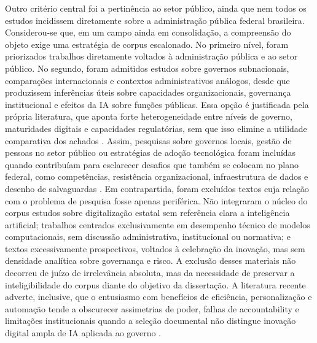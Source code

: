 \documentclass[12pt,a4paper]{article}
\begin{document}
Outro critério central foi a pertinência ao setor público, ainda que nem todos os estudos incidissem diretamente sobre a administração pública federal brasileira. Considerou-se que, em um campo ainda em consolidação, a compreensão do objeto exige uma estratégia de corpus escalonado. No primeiro nível, foram priorizados trabalhos diretamente voltados à administração pública e ao setor público. No segundo, foram admitidos estudos sobre governos subnacionais, comparações internacionais e contextos administrativos análogos, desde que produzissem inferências úteis sobre capacidades organizacionais, governança institucional e efeitos da IA sobre funções públicas. Essa opção é justificada pela própria literatura, que aponta forte heterogeneidade entre níveis de governo, maturidades digitais e capacidades regulatórias, sem que isso elimine a utilidade comparativa dos achados \autocite{criado2024artificial} \autocite{yiitcanlar2022artificial} \autocite{criado2024inteligencia}. Assim, pesquisas sobre governos locais, gestão de pessoas no setor público ou estratégias de adoção tecnológica foram incluídas quando contribuíam para esclarecer desafios que também se colocam no plano federal, como competências, resistência organizacional, infraestrutura de dados e desenho de salvaguardas \autocite{chilunjika2022artificial} \autocite{cho2023human} \autocite{melo2026competencias}.
Em contrapartida, foram excluídos textos cuja relação com o problema de pesquisa fosse apenas periférica. Não integraram o núcleo do corpus estudos sobre digitalização estatal sem referência clara a inteligência artificial; trabalhos centrados exclusivamente em desempenho técnico de modelos computacionais, sem discussão administrativa, institucional ou normativa; e textos excessivamente prospectivos, voltados à celebração da inovação, mas sem densidade analítica sobre governança e risco. A exclusão desses materiais não decorreu de juízo de irrelevância absoluta, mas da necessidade de preservar a inteligibilidade do corpus diante do objetivo da dissertação. A literatura recente adverte, inclusive, que o entusiasmo com benefícios de eficiência, personalização e automação tende a obscurecer assimetrias de poder, falhas de accountability e limitações institucionais quando a seleção documental não distingue inovação digital ampla de IA aplicada ao governo \autocite{alhosani2024opportunities} \autocite{pi2021machine} \autocite{serra2024a}.
\end{document}
